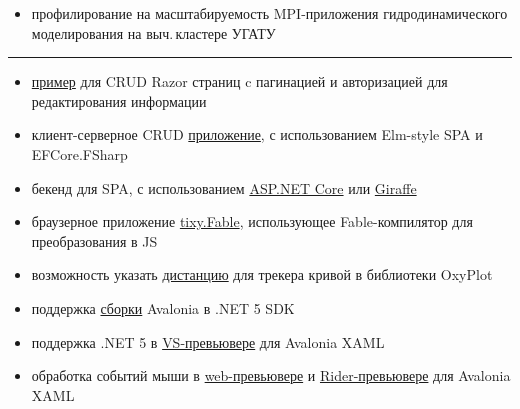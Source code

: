 \documentclass[10pt,a4paper,ragged2e,withhyper]{altacv}
\begin{document}
\begin{paracol}{2}
\begin{itemize}
  \item профилирование на масштабируемость  MPI-приложения
  \newline гидродинамического моделирования на выч.\,кластере УГАТУ

\end{itemize}

{\color{headingrule}\rule{\linewidth}{1pt}\par}\medskip


\smallskip

\begin{itemize}

  \item \href{https://github.com/rstm-sf/FilmsCatalog/pull/1}{пример}
  для CRUD Razor страниц c пагинацией
  и авторизацией для редактирования информации
  \smallskip

  \item клиент-серверное CRUD
  \href{https://github.com/rstm-sf/ClientServerCRUD}{приложение},
  с использованием Elm-style SPA и EFCore.FSharp
  \smallskip

  \item бекенд для SPA, с использованием
  \href{https://github.com/rstm-sf/ASP.NETCoreBackendFor-Angular-GettingStarted}{ASP.NET Core} или
  \href{https://github.com/rstm-sf/GiraffeBackendFor-Angular-GettingStarted}{Giraffe}
  \smallskip

  \item браузерное приложение
  \href{https://github.com/rstm-sf/tixy.Fable}{tixy.Fable},
  использующее Fable-компилятор для преобразования в JS
  \smallskip

  \item возможность указать
  \href{https://github.com/oxyplot/oxyplot/pull/1736}{дистанцию}
  для трекера кривой в библиотеки OxyPlot
  \smallskip

  \item поддержка
  \href{https://github.com/AvaloniaUI/Avalonia/pull/5415}{сборки}
  Avalonia в .NET 5 SDK
  \smallskip

  \item поддержка .NET 5 в
  \href{https://github.com/AvaloniaUI/AvaloniaVS/pull/181}{VS-превьювере}
  для Avalonia XAML 
  \smallskip

  \item обработка событий мыши в
  \href{https://github.com/AvaloniaUI/Avalonia/pull/4418}{web-превьювере}
  и \href{https://github.com/ForNeVeR/AvaloniaRider/pull/82}{Rider-превьювере}
  для Avalonia XAML 
  \smallskip


\end{itemize}
\end{paracol}
\end{document}
